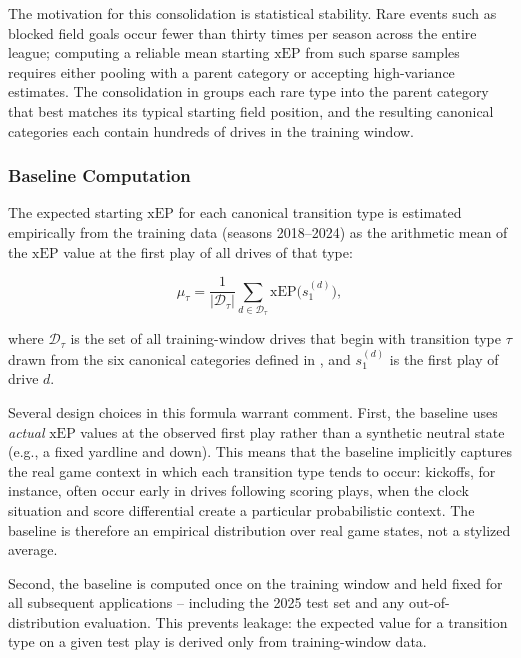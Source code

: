 The motivation for this consolidation is statistical stability. Rare events
such as blocked field goals occur fewer than thirty times per season across
the entire league; computing a reliable mean starting $\mathrm{xEP}$ from such
sparse samples requires either pooling with a parent category or accepting
high-variance estimates. The consolidation in  groups
each rare type into the parent category that best matches its typical
starting field position, and the resulting canonical categories each contain
hundreds of drives in the training window.

\subsubsection{Baseline Computation}

The expected starting $\mathrm{xEP}$ for each canonical transition type is
estimated empirically from the training data (seasons 2018--2024) as the
arithmetic mean of the $\mathrm{xEP}$ value at the first play of all drives of
that type:

\begin{equation}
  \label{eq:st-baseline}
  \mu_{\tau} = \frac{1}{|\mathcal{D}_{\tau}|}
    \sum_{d \in \mathcal{D}_{\tau}} \mathrm{xEP}\!\bigl(s_1^{(d)}\bigr),
\end{equation}

where $\mathcal{D}_{\tau}$ is the set of all training-window drives that begin
with transition type $\tau$ drawn from the six canonical categories defined in
, and $s_1^{(d)}$ is the first play of drive $d$.

Several design choices in this formula warrant comment. First, the baseline
uses \emph{actual} $\mathrm{xEP}$ values at the observed first play rather than
a synthetic neutral state (e.g., a fixed yardline and down). This means that
the baseline implicitly captures the real game context in which each
transition type tends to occur: kickoffs, for instance, often occur
early in drives following scoring plays, when the clock situation and score
differential create a particular probabilistic context. The baseline is
therefore an empirical distribution over real game states, not a
stylized average.

Second, the baseline is computed once on the training window and held fixed
for all subsequent applications -- including the 2025 test set and any
out-of-distribution evaluation. This prevents leakage: the expected value
for a transition type on a given test play is derived only from training-window
data.

